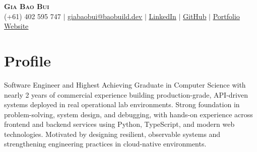 \documentclass[letterpaper,11pt]{article}
\begin{document}

\begin{center}
  \textbf{\Huge \scshape Gia Bao Bui} \\ \vspace{1pt}
  \small (+61) 402 595 747 $|$ \href{mailto:giabaobui@baobuild.dev}{\uline{giabaobui@baobuild.dev}} $|$
  \href{https://www.linkedin.com/in/gia-bao-bui-227476227/}{\uline{LinkedIn}} $|$
  \href{https://github.com/giabaobui-nedy}{\uline{GitHub}} $|$
  \href{https://www.baobuild.dev/}{\uline{Portfolio Website}}
\end{center}

\section{Profile}
\small{Software Engineer and Highest Achieving Graduate in Computer Science with nearly 2 years of commercial experience building production-grade, API-driven systems deployed in real operational lab environments. Strong foundation in problem-solving, system design, and debugging, with hands-on experience across frontend and backend services using Python, TypeScript, and modern web technologies. Motivated by designing resilient, observable systems and strengthening engineering practices in cloud-native environments.}\justifying


\end{document}
